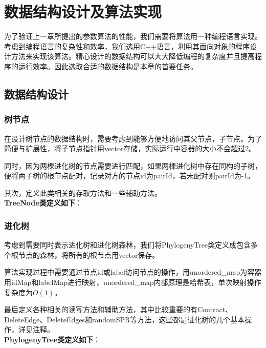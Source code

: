 

\chapter{数据结构设计及算法实现}
为了验证上一章所提出的参数算法的性能，我们需要将算法用一种编程语言实现。考虑到编程语言的复杂性和效率，我们选用C++语言，利用其面向对象的程序设计方法来实现该算法。精心设计的数据结构可以大大降低编程的复杂度并且提高程序的运行效率。因此选取合适的数据结构是本章的首要任务。

\section{数据结构设计}

\subsection{树节点}
在设计树节点的数据结构时，需要考虑到能够方便地访问其父节点，子节点。为了简便与扩展性，将子节点指针用vector存储，实际运行中容器的大小不会超过2。

同时，因为两棵进化树的节点需要进行匹配，如果两棵进化树中存在同构的子树，便将两子树的根节点配对，记录对方的节点id为pairId，若未配对则pairId为-1。

其次，定义此类相关的存取方法和一些辅助方法。\\
\textbf{TreeNode类定义如下}：


\subsection{进化树}
考虑到需要同时表示进化树和进化树森林，我们将PhylogenyTree类定义成包含多个根节点的森林，将所有的根节点用vector保存。

算法实现过程中需要通过节点id或label访问节点的操作，用unordered\_map为容器用idMap和labelMap进行映射，unordered\_map内部原理是哈希表，单次映射操作复杂度为$O(1)$。

最后定义各种相关的读写方法和辅助方法，其中比较重要的有Contract、DeleteEdge、DeleteEdges和randomSPR等方法，这些都是进化树的几个基本操作，详见注释。
\\ \textbf{PhylogenyTree类定义如下}：


